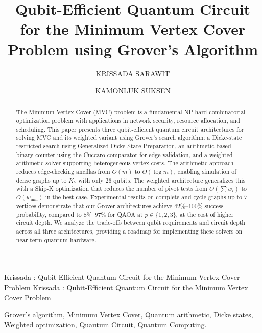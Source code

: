 \documentclass{ieeeaccess}
\begin{document}
\def\theyear{2026}
\def\thevol{XX}

\title{Qubit-Efficient Quantum Circuit for the Minimum Vertex Cover Problem using Grover's Algorithm}

\author{\uppercase{Krissada Sarawit} \and \uppercase{Kamonluk Suksen}}

\address[1]{Department of Computer Engineering, Faculty of Engineering, Chulalongkorn University, Bangkok 10330, Thailand}



\markboth
{Krissada \headeretal: Qubit-Efficient Quantum Circuit for the Minimum Vertex Cover Problem}
{Krissada \headeretal: Qubit-Efficient Quantum Circuit for the Minimum Vertex Cover Problem}


\begin{abstract}
The Minimum Vertex Cover (MVC) problem is a fundamental
NP-hard combinatorial optimization problem with applications
in network security, resource allocation, and scheduling.
This paper presents three qubit-efficient quantum circuit
architectures for solving MVC and its weighted variant using
Grover's search algorithm: a Dicke-state restricted search
using Generalized Dicke State Preparation, an arithmetic-based
binary counter using the Cuccaro comparator for edge
validation, and a weighted arithmetic solver supporting
heterogeneous vertex costs. The arithmetic approach reduces
edge-checking ancillas from $O(m)$ to $O(\log m)$, enabling
simulation of dense graphs up to $K_7$ with only 26 qubits.
The weighted architecture generalizes this with a Skip-K
optimization that reduces the number of pivot tests from
$O(\sum w_i)$ to $O(w_{\min})$ in the best case. Experimental
results on complete and cycle graphs up to 7 vertices
demonstrate that our Grover architectures achieve
$42\%$--$100\%$ success probability, compared to $8\%$--$97\%$
for QAOA at $p \in \{1,2,3\}$, at the cost of higher circuit
depth. We analyze the trade-offs between qubit requirements
and circuit depth across all three architectures, providing
a roadmap for implementing these solvers on near-term quantum
hardware.
\end{abstract}

\begin{keywords}
Grover's algorithm, Minimum Vertex Cover, Quantum arithmetic, Dicke states, Weighted optimization, Quantum Circuit, Quantum Computing.
\end{keywords}
\end{document}
